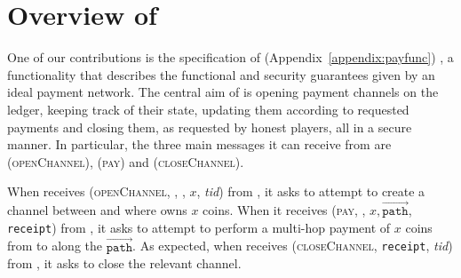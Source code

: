 \section{Overview of \fpaynet{}}
  One of our contributions is the specification of \fpaynet
  (Appendix~\ref{appendix:payfunc}) , a functionality
  that describes the functional and security guarantees given by an ideal
  payment network. The central aim of \fpaynet{} is opening payment channels on
  the ledger, keeping track of their state, updating them according to requested
  payments and closing them, as requested by honest players, all in a secure
  manner. In particular, the three main messages it can receive from \alice{}
  are (\textsc{openChannel}), (\textsc{pay}) and (\textsc{closeChannel}).

  When \fpaynet{} receives (\textsc{openChannel}, \alice, \bob, $x$,
  \textit{tid}) from \alice, it asks \simulator{} to attempt to create a channel
  between \alice{} and \bob{} where \alice{} owns $x$ coins. When it receives
  (\textsc{pay}, \bob, $x, \overrightarrow{\mathtt{path}}$, \texttt{receipt})
  from \alice, it asks \simulator{} to attempt to perform a multi-hop payment of
  $x$ coins from \alice{} to \bob{} along the $\overrightarrow{\mathtt{path}}$.
  As expected, when \fpaynet{} receives (\textsc{closeChannel}, \texttt{receipt},
  \textit{tid}) from \alice, it asks \simulator{} to close the relevant channel.

